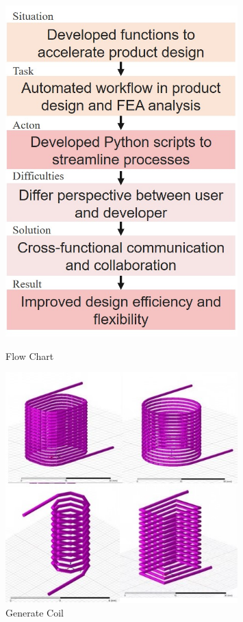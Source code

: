 \documentclass[10pt, letterpaper]{article}
\begin{document}
    \begin{figure}[htbp]
        \begin{minipage}[c]{0.5\linewidth}
            \centering
            \includegraphics[width=0.8\textwidth]{fig/Delta Electronics/Delta Flow Chart.png.jpg}
            \caption{Flow Chart}
        \end{minipage}%
        \begin{minipage}[c]{0.5\linewidth}
            \centering
            \includegraphics[width=0.8\textwidth]{fig/Delta Electronics/generate coil.jpg}
            \caption{Generate Coil}
        \end{minipage}


\end{figure}
\end{document}
